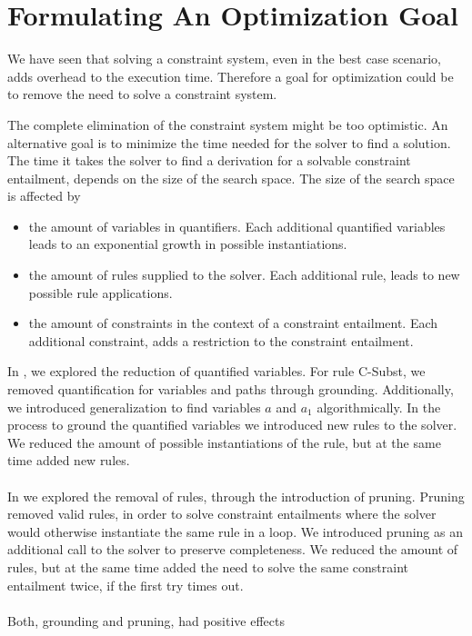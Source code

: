 \section{Formulating An Optimization Goal} %
\label{sec:goal}
We have seen that solving a constraint system,
even in the best case scenario,
adds overhead to the execution time.
Therefore a goal for optimization could be
to remove the need to solve a constraint system.

The complete elimination of the constraint system
might be too optimistic. An alternative goal
is to minimize the time needed for the solver to find a solution.
The time it takes the solver to find a derivation for a solvable
constraint entailment, depends on the size of the search space.
The size of the search space is affected by
\begin{itemize}
  \item the amount of variables in quantifiers.
        Each additional quantified variables leads to an exponential growth in possible instantiations.
  \item the amount of rules supplied to the solver.
        Each additional rule, leads to new possible rule applications.
  \item the amount of constraints in the context of a constraint entailment.
        Each additional constraint, adds a restriction to the constraint entailment.
\end{itemize}
In ,
we explored the reduction of quantified variables.
For rule C-Subst, we removed quantification
for variables and paths through grounding.
Additionally, we introduced generalization
to find variables $a$ and $a_1$ algorithmically.
In the process to ground the quantified variables
we introduced new rules to the solver.
We reduced the amount of possible instantiations of the rule,
but at the same time added new rules.\\
\\
In  we explored the removal of rules,
through the introduction of pruning.
Pruning removed valid rules,
in order to solve constraint entailments
where the solver would otherwise
instantiate the same rule in a loop.
We introduced pruning
as an additional call to the solver
to preserve completeness.
We reduced the amount of rules,
but at the same time added
the need to solve the same constraint entailment twice,
if the first try times out.\\
\\
Both, grounding and pruning, had positive effects
